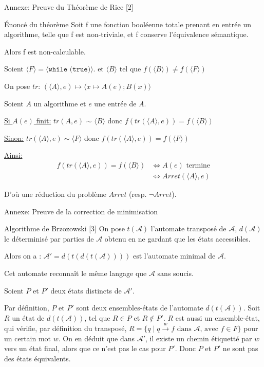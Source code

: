 \documentclass{beamer}
\newcommand{\prog}[1]{{\langle #1 \rangle}}
\begin{document}
\begin{frame}{Annexe: Preuve du Théorème de Rice [2]}
  \begin{alertblock}{Énoncé du théorème}
    Soit f une fonction booléenne totale prenant en entrée un algorithme, telle que
    f est non-triviale, et f conserve l'équivalence sémantique.

    Alors f est non-calculable.
  \end{alertblock}
  Soient $\prog{F} = \prog{\texttt{while (true)}}$.
  et $\prog{B}$ tel que $f(\prog{B}) \neq f(\prog{F})$

  On pose $tr$: $(\prog{A},e) \longmapsto \prog{x \mapsto A(e); B(x)}$

  Soient $A$ un algorithme et $e$ une entrée de $A$.

  \underline{Si $A(e)$ finit:} $tr(A, e)$ $\sim$ $\prog{B}$ donc $f(tr(\prog{A}, e)) = f(\prog{B})$
  
  \underline{Sinon:} $tr(\prog{A}, e) \sim \prog{F}$ donc $f(tr(\prog{A}, e)) = f(\prog{F})$

  \underline{Ainsi:}
  \begin{align*}
    f(tr(\prog{A}, e)) = f(\prog{B}) & \Longleftrightarrow A(e) \text{ termine} \\
                                     & \Longleftrightarrow Arret(\prog{A}, e)
  \end{align*}

  D'où une réduction du problème $Arret$ (resp. $\neg Arret$).
\end{frame}

\begin{frame}{Annexe: Preuve de la correction de minimisation}
  \begin{alertblock}{Algorithme de Brzozowski [3]}
    On pose $t(\mathcal{A})$ l'automate transposé de $\mathcal{A}$, $d(\mathcal{A})$ le déterminisé par parties de $\mathcal{A}$
    obtenu en ne gardant que les états accessibles.
    
    Alors on a : $\mathcal{A}' = d(t(d(t(\mathcal{A}))))$ est l'automate minimal de $\mathcal{A}$.
  \end{alertblock}
  Cet automate reconnaît le même langage que $\mathcal{A}$ sans soucis.
  
  Soient $P$ et $P'$ deux états distincts de $\mathcal{A}'$.



  
  Par définition, $P$ et $P'$ sont deux ensembles-états de l'automate $d(t(\mathcal{A}))$.
  Soit $R$ un état de $d(t(\mathcal{A}))$, tel que $R \in P$ et $R \notin P'$. $R$ est aussi un ensemble-état, qui vérifie,
  par définition du transposé, $R = \{q \;|\; q \xrightarrow{w} f \text{ dans } \mathcal{A} \text{, avec } f \in F\}$ pour un certain mot $w$.
  On en déduit que dans $\mathcal{A'}$, il existe un chemin étiquetté par $w$ vers un état final,
  alors que ce n'est pas le cas pour $P'$. Donc $P$ et $P'$ ne sont pas des états équivalents. %
\end{frame}
\end{document}
